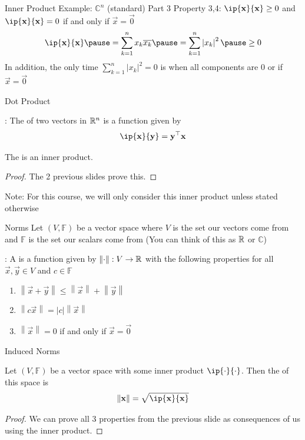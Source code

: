 \documentclass[xcoler=dvipsnames, aspectratio=169]{beamer}
\newcommand{\C}{\mathbb{C}}
\newcommand{\F}{\mathbb{F}}
\newcommand{\abs}[1]{\left|#1\right|}
\newcommand{\norm}[1]{\left\|#1\right\|}
\begin{document}
    \begin{frame}{Inner Product Example: $\C^n$ (standard) Part 3}
        Property 3,4: $\ip{\vec{x}}{\vec{x}}\geq 0$ and $\ip{\vec{x}}{\vec{x}} = 0$ if and only if
        $\vec{x} = \vec{0}$
        \[
            \ip{\vec{x}}{\vec{x}}\pause = \sum_{k=1}^n x_k\overline{x_k}
            \pause = \sum_{k=1}^n \abs{x_k}^2\pause \geq 0
        \]\pause
        In addition, the only time $\sum_{k=1}^n \abs{x_k}^2=0$ is when all components are 0 or 
        if $\vec{x}=\vec{0}$
    \end{frame}
    \begin{frame}{Dot Product}
        \begin{defn}
            : The  of two vectors in $\mathbb{R}^n$ is a function given by
            \[
                \ip{\vec{x}}{\vec{y}} = \vec{y}^\top\vec{x}
            \]
        \end{defn}\pause
        \begin{theorem}
            The  is an inner product.
        \end{theorem}\pause
        \begin{proof}
            The 2 previous slides prove this.
        \end{proof}\pause
        Note: For this course, we will only consider this inner product unless stated otherwise
    \end{frame}
    \begin{frame}{Norms}
        Let $(V,\F)$ be a vector space where $V$ is the set our vectors come from and $\F$ is the 
        set our scalars come from (You can think of this as $\mathbb{R}$ or $\C$)\pause
        \begin{defn}
            : A  is a function given by $\norm{\cdot}:V\rightarrow\R$
            with the following properties for all $\vec{x},\vec{y}\in V$ and $c\in\F$
            \begin{enumerate}
                \pause\item $\norm{\vec{x} + \vec{y}}\leq \norm{\vec{x}} + \norm{\vec{y}}$
                \pause\item $\norm{c\vec{x}} = \abs{c}\norm{\vec{x}}$
                \pause\item $\norm{\vec{x}} = 0$ if and only if $\vec{x} = \vec{0}$
            \end{enumerate}
        \end{defn}
    \end{frame}
    \begin{frame}{Induced Norms}
        \begin{theorem}
            Let $(V,\F)$ be a vector space with some inner product $\ip{\cdot}{\cdot}$. Then the
             of this space is
            \[
                \norm{\vec{x}} = \sqrt{\ip{\vec{x}}{\vec{x}}}
            \]
        \end{theorem}\pause
        \begin{proof}
            We can prove all 3 properties from the previous slide as consequences of us using the
            inner product.
        \end{proof}
    \end{frame}
\end{document}
